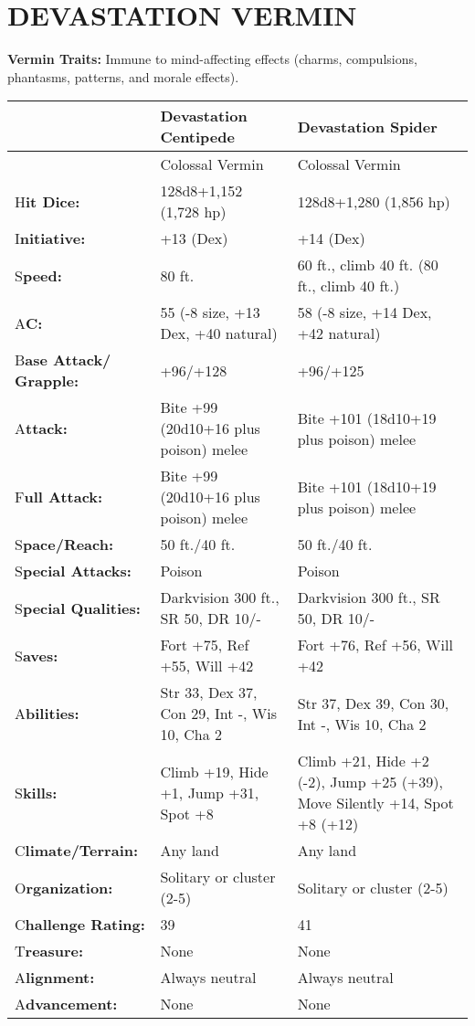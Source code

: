 \documentclass{article}
\begin{document}
\vspace{12pt}
\section*{{\LARGE{}DEVASTATION VERMIN }}

\textbf{Vermin Traits: }Immune to mind-affecting effects (charms, compulsions, 
phantasms, patterns, and morale effects). 

\begin{tabular}{|>{\raggedright}p{63pt}|>{\raggedright}p{125pt}|>{\raggedright}p{125pt}|}
\hline
  & D\textbf{evastation Centipede } & D\textbf{evastation Spider }\tabularnewline
\hline
 & Colossal Vermin  & Colossal Vermin \tabularnewline
\hline
H\textbf{it Dice:}  & 128d8+1,152 (1,728 hp)  & 128d8+1,280 (1,856 hp) \tabularnewline
\hline
I\textbf{nitiative:}  & +13 (Dex)  & +14 (Dex) \tabularnewline
\hline
S\textbf{peed:}  & 80 ft.  & 60 ft., climb 40 ft. (80 ft., climb 40 ft.) \tabularnewline
\hline
A\textbf{C:}  & 55 (-8 size, +13 Dex, +40 natural)  & 58 (-8 size, +14 Dex, +42 
natural) \tabularnewline
\hline
B\textbf{ase Attack/ Grapple:} & +96/+128 & +96/+125\tabularnewline
\hline
A\textbf{ttack:} & Bite +99 (20d10+16 plus poison) melee & Bite +101 (18d10+19 
plus poison) melee\tabularnewline
\hline
F\textbf{ull Attack:} & Bite +99 (20d10+16 plus poison) melee & Bite +101 (18d10+19 
plus poison) melee\tabularnewline
\hline
S\textbf{pace/Reach:}  & 50 ft./40 ft.  & 50 ft./40 ft. \tabularnewline
\hline
S\textbf{pecial Attacks:}  & Poison  & Poison \tabularnewline
\hline
S\textbf{pecial Qualities:}  & Darkvision 300 ft., SR 50, DR 10/-  & Darkvision 
300 ft., SR 50, DR 10/-\tabularnewline
\hline
S\textbf{aves:}  & Fort +75, Ref +55, Will +42  & Fort +76, Ref +56, Will +42 \tabularnewline
\hline
A\textbf{bilities:}  & Str 33, Dex 37, Con 29, Int -, Wis 10, Cha 2 & Str 37, Dex 
39, Con 30, Int -, Wis 10, Cha 2\tabularnewline
\hline
S\textbf{kills:} & Climb +19, Hide +1, Jump +31, Spot +8 & Climb +21, Hide +2 (-2), 
Jump +25 (+39), Move Silently +14, Spot +8 (+12)\tabularnewline
\hline
C\textbf{limate/Terrain:}  & Any land  & Any land \tabularnewline
\hline
O\textbf{rganization:}  & Solitary or cluster (2-5)  & Solitary or cluster (2-5) 
\tabularnewline
\hline
C\textbf{hallenge Rating:}  & 39  & 41 \tabularnewline
\hline
T\textbf{reasure:}  & None  & None \tabularnewline
\hline
A\textbf{lignment:}  & Always neutral  & Always neutral \tabularnewline
\hline
A\textbf{dvancement:}  & None  & None \tabularnewline
\hline
\end{tabular}
\end{document}
